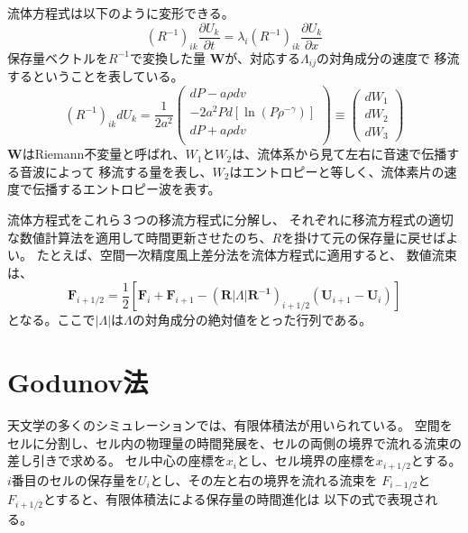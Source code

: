 流体方程式は以下のように変形できる。
\begin{equation}
(R^{-1})_{ik} \frac{\partial U_k}{\partial t}
= \lambda_i (R^{-1})_{ik} \frac{\partial U_k}{\partial x}
\end{equation}
保存量ベクトルを$R^{-1}$で変換した量
$\bm{ W}$が、対応する$\Lambda_{ij}$の対角成分の速度で
移流するということを表している。
\begin{equation}
(R^{-1})_{ik} dU_k
=
\frac{1}{2a^2}\left(
\begin{array}{c}
\displaystyle
    dP - a \rho d v \\
  \displaystyle 
  - 2a^2P d\left[\ln \left( P \rho^{-\gamma}\right)\right] \\
\displaystyle
    dP + a \rho d v \\
\end{array}
\right)
\equiv
\left(
\begin{array}{c}
dW_1 \\ 
dW_2 \\
dW_3 
\end{array}
\right)
\end{equation}
$\bm{ W}$はRiemann不変量と呼ばれ、$W_1$と$W_2$は、流体系から見て左右に音速で伝播する音波によって
移流する量を表し、$W_2$はエントロピーと等しく、流体素片の速度で伝播するエントロピー波を表す。

流体方程式をこれら３つの移流方程式に分解し、
それぞれに移流方程式の適切な数値計算法を適用して時間更新させたのち、$R$を掛けて元の保存量に戻せばよい。
たとえば、空間一次精度風上差分法を流体方程式に適用すると、
数値流束は、
\begin{equation}
    \bm{ F}_{i+1/2}
    = \frac{1}{2}\left[\bm{ F}_i + \bm{ F}_{i+1} 
     - \left(\bm{ R} |\Lambda| \bm{ R^{-1}}\right)_{i+1/2} \left( \bm{ U}_{i+1} - \bm{ U}_i \right)
     \right]
\end{equation}
となる。ここで$|\Lambda|$は$\Lambda$の対角成分の絶対値をとった行列である。







\clearpage
\section{Godunov法}\label{sec:godunov}



天文学の多くのシミュレーションでは、有限体積法が用いられている。
空間をセルに分割し、セル内の物理量の時間発展を、セルの両側の境界で流れる流束の
差し引きで求める。
セル中心の座標を$x_{i}$とし、セル境界の座標を$x_{i+1/2}$とする。
$i$番目のセルの保存量を$U_i$とし、その左と右の境界を流れる流束を
$F_{i-1/2}$と$F_{i+1/2}$とすると、有限体積法による保存量の時間進化は
以下の式で表現される。

